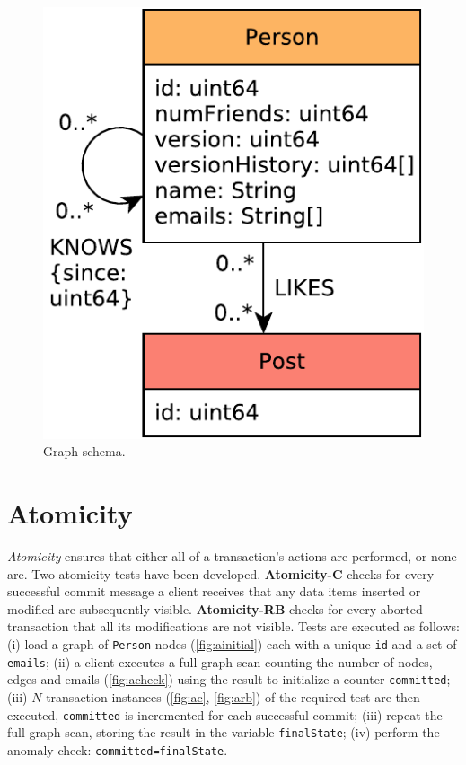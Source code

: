 \begin{figure}
  \centering
  \includegraphics[scale=\yedscale]{figures/acid/core-schema}
  \caption{Graph schema.}
  \label{fig:core-schema}
\end{figure}

\begin{figure}
  \centering
  
\end{figure}

\section{Atomicity}
\label{sec:atomicity}

\emph{Atomicity} ensures that either all of a transaction's actions are performed, or none are.
Two atomicity tests have been developed.
\textbf{Atomicity-C} checks for every successful commit message a client receives that any data items inserted or modified are subsequently visible.
\textbf{Atomicity-RB} checks for every aborted transaction that all its modifications are not visible.
%
Tests are executed as follows:
(i) load a graph of \texttt{Person} nodes (\autoref{fig:ainitial}) each with a unique \texttt{id} and a set of \texttt{emails};
(ii) a client executes a full graph scan counting the number of nodes, edges and emails (\autoref{fig:acheck}) using the result to initialize a counter \texttt{committed};
(iii) $N$ transaction instances (\autoref{fig:ac}, \autoref{fig:arb}) of the required test are then executed, \texttt{committed} is incremented for each successful commit;
(iii) repeat the full graph scan, storing the result in the variable \texttt{finalState};
(iv) perform the anomaly check: \texttt{committed=finalState}.

